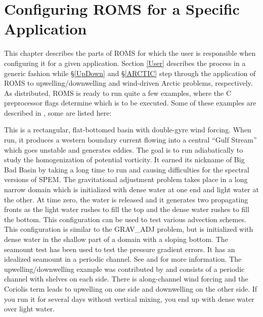 \section{Configuring ROMS for a Specific Application}
\label{Wave}
This chapter describes the parts of ROMS for which the user is
responsible when configuring it for a given application.  Section
\ref{User} describes the process in a generic fashion while
\S\ref{UpDown} and \S\ref{ARCTIC} step through the application of ROMS
to upwelling/downwelling and wind-driven Arctic problems,
respectively.  As distributed, ROMS is ready to run quite a few
examples, where the C preprocessor flags determine which is to be
executed.  Some of these examples are described in
\cite{Haidvogel99}, some are listed here:
\begin{klist}
    This is a rectangular, flat-bottomed basin with
 double-gyre wind forcing. When run, it produces a western boundary
 current flowing into a central ``Gulf Stream''
 which goes unstable and generates eddies. The goal is to run
 adiabatically to study the homogenization of potential vorticity.
 It earned its nickname of Big Bad Basin by taking a long time to
 run and causing difficulties for the spectral versions of SPEM.
    The gravitational adjustment problem takes place
 in a long narrow domain which is initialized with dense water at one
 end and light water at the other. At time zero, the water is released
 and it generates two propagating fronts as the light water rushes to
 fill the top and the dense water rushes to fill the bottom. This
 configuration can be used to test various advection schemes.
      This configuration is similar to the
 GRAV\_ADJ problem, but is initialized with dense water in the shallow
part of a domain with a sloping bottom.
      The seamount test has been used to test the pressure
 gradient errors.  It has an idealized seamount in a periodic channel.
 See \cite{BH93} and \cite{McCalpin94} for more information.
     The upwelling/downwelling example was
 contributed by \cite{Macks93}
 and consists of a periodic channel with shelves on each side.
 There is along-channel wind forcing and the Coriolis term leads
 to upwelling on one side and downwelling on the other side. If
 you run it for several days without vertical mixing, you end up with
 dense water over light water.
\end{klist}

